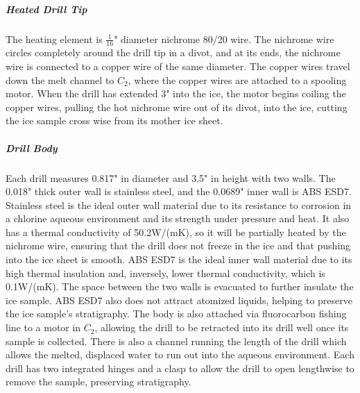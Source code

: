 \documentclass{article}
\begin{document}
\subparagraph{Heated Drill Tip}
The heating element is $\frac{1}{16}$" diameter nichrome 80/20 wire. The nichrome wire circles completely around the drill tip in a divot, and at its ends, the nichrome wire is connected to a copper wire of the same diameter. The copper wires travel down the melt channel to $C_2$, where the copper wires are attached to a spooling motor. When the drill has extended 3" into the ice, the motor begins coiling the copper wires, pulling the hot nichrome wire out of its divot, into the ice, cutting the ice sample cross wise from its mother ice sheet.
\subparagraph{Drill Body}
Each drill measures 0.817" in diameter and 3.5" in height with two walls. The 0.018" thick outer wall is stainless steel, and the 0.0689" inner wall is ABS ESD7. Stainless steel is the ideal outer wall material due to its resistance to corrosion in a chlorine aqueous environment and its strength under pressure and heat. It also has a thermal conductivity of 50.2W/(mK), so it will be partially heated by the nichrome wire, ensuring that the drill does not freeze in the ice and that pushing into the ice sheet is smooth. ABS ESD7 is the ideal inner wall material due to its high thermal insulation and, inversely, lower thermal conductivity, which is 0.1W/(mK). The space between the two walls is evacuated to further insulate the ice sample. ABS ESD7 also does not attract atomized liquids, helping to preserve the ice sample’s stratigraphy. The body is also attached via fluorocarbon fishing line to a motor in $C_2$, allowing the drill to be retracted into its drill well once its sample is collected. There is also a channel running the length of the drill which allows the melted, displaced water to run out into the aqueous environment. Each drill has two integrated hinges and a clasp to allow the drill to open lengthwise to remove the sample, preserving stratigraphy.
\end{document}
